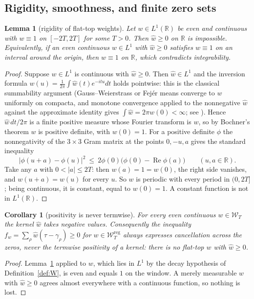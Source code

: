 \documentclass[11pt]{amsart}
\newtheorem{lemma}[theorem]{Lemma}
\newtheorem{corollary}[theorem]{Corollary}
\theoremstyle{definition}
\theoremstyle{remark}
\newcommand{\R}{\mathbb R}
\newcommand{\Rel}{\operatorname{Re}}
\newcommand{\wh}{\widehat w}
\newcommand{\Wcl}{\mathcal W_T}
\begin{document}
\subsection{Rigidity, smoothness, and finite zero sets}

\begin{lemma}[rigidity of flat-top weights]\label{lem:Rrig}
Let $w\in L^1(\R)$ be even and continuous with $w\equiv1$ on $[-2T,2T]$ for some $T>0$. Then
$\wh\ge0$ on $\R$ is impossible. Equivalently, if an even continuous $w\in L^1$ with $\wh\ge0$
satisfies $w\equiv1$ on an interval around the origin, then $w\equiv1$ on $\R$, which contradicts
integrability.
\end{lemma}
\begin{proof}
Suppose $w\in L^1$ is continuous with $\wh\ge0$. Then $\wh\in L^1$ and the inversion formula
$w(u)=\frac1{2\pi}\int\wh(t)e^{-itu}dt$ holds pointwise: this is the classical summability argument
(Gauss--Weierstrass or Fej\'er means converge to $w$ uniformly on compacta, and monotone convergence
applied to the nonnegative $\wh$ against the approximate identity gives $\int\wh=2\pi w(0)<\infty$;
see \cite[Ch.~VI]{Katznelson}). Hence $\wh\,dt/2\pi$ is a finite positive measure whose Fourier
transform is $w$, so by Bochner's theorem $w$ is positive definite, with $w(0)=1$. For a positive
definite $\phi$ the nonnegativity of the $3\times3$ Gram matrix at the points $0,-u,a$ gives the
standard inequality
\[
|\phi(u+a)-\phi(u)|^2\ \le\ 2\phi(0)\big(\phi(0)-\Rel\phi(a)\big)\qquad(u,a\in\R).
\]
Take any $a$ with $0<|a|\le2T$: then $w(a)=1=w(0)$, the right side vanishes, and $w(u+a)=w(u)$ for
every $u$. So $w$ is periodic with every period in $(0,2T]$; being continuous, it is constant, equal
to $w(0)=1$. A constant function is not in $L^1(\R)$.
\end{proof}

\begin{corollary}[positivity is never termwise]\label{cor:nontermwise}
For every even continuous $w\in\Wcl$ the kernel $\wh$ takes negative values. Consequently the
inequality $f_w=\sum_\rho\wh(\tau-\gamma_\rho)\ge0$ for $w\in\Wcl^{\mathrm{reg}}$ always expresses
cancellation across the zeros, never the termwise positivity of a kernel: there is no flat-top $w$
with $\wh\ge0$.
\end{corollary}
\begin{proof}
Lemma~\ref{lem:Rrig} applied to $w$, which lies in $L^1$ by the decay hypothesis of
Definition~\ref{def:W}, is even and equals $1$ on the window. A merely measurable $w$ with $\wh\ge0$
agrees almost everywhere with a continuous function, so nothing is lost.
\end{proof}
\end{document}
